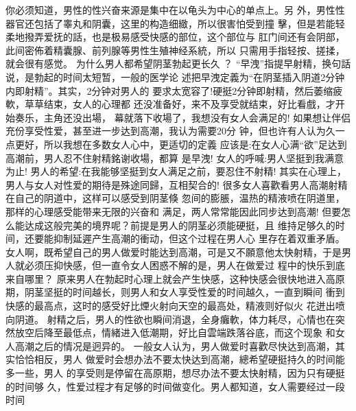 \documentclass[12pt,UTF8]{ctexbook}
\begin{document}
你必须知道，男性的性兴奋来源是集中在以龟头为中心的单点上。另
外，男性性器官还包括了睾丸和阴囊，这里的构造细緻，所以很害怕受到撞
擊，但是若能轻柔地撥弄爱抚的話，也是极易感受快感的部位，这个部位与
肛门间还有会阴部，此间密佈着精囊腺、前列腺等男性生殖神经系統，所以
只需用手指轻按、搓揉，就会很有感觉。
为什么男人都希望阴茎勃起更长久 ？
“早洩”指提早射精，换句話说，是勃起的时间太短暂，一般的医学论
述把早洩定義为“在阴茎插入阴道2分钟内即射精”。其实，2分钟对男人的
要求太宽容了!硬挺2分钟即射精，然后萎缩疲軟，草草结束，女人的心理都
还没准备好，来不及享受就结束，好比看戲，才开始奏乐，主角还没出場，
幕就落下收場了，我想没有女人会满足的!
如果想让伴侣充份享受性爱，甚至进一步达到高潮，我认为需要20分
钟，但也许有人认为久一点更好，所以我想在多数女人心中，更适切的定義
应该是:在女人心满“欲”足达到高潮前，男人忍不住射精銘谢收場，都算
是早洩!
女人的呼喊:男人坚挺到我满意为止!
男人的希望:在我能够坚挺到女人满足之前，要忍住不射精!
其实在心理上，男人与女人对性爱的期待是殊途同歸，互相契合的!
很多女人喜歡看男人高潮射精在自己的阴道中，这样可以感受到阴茎倏
忽间的膨脹，温热的精液喷在阴道里，那样的心理感受能带来无限的兴奋和
满足，两人常常能因此同步达到高潮!
但要怎么能达成这般完美的境界呢？前提是男人的阴茎必须能硬挺，且
维持足够久的时间，还要能抑制延遲产生高潮的衝动，但这个过程在男人心
里存在着双重矛盾。
女人啊，既希望自己的男人做爱时能达到高潮，可是又不願意他太快射精，于是男人就必须压抑快感，但一直令女人困惑不解的是，男人在做爱过
程中的快乐到底来自哪里？
原来男人在勃起时心理上就会产生快感，这种快感会很快地进入高原
期，阴茎坚挺的时间越长，则男人和女人享受性爱的时间越久，一直到瞬间
衝到快感的最高点，这时的感受好比煙火射向天空的最高处，精液则好似火
花迸出喷向阴道。
射精之后，男人的性欲也瞬间消退，全身癱軟，体力耗尽，心情也在突
然放空后降至最低点，情緒进入低潮期，好比自雲端跌落谷底，而这个现象
和女人高潮之后的情况是迥异的。
一般女人认为，男人做爱时喜歡尽快达到高潮，其实恰恰相反，男人
做爱时会想办法不要太快达到高潮，總希望硬挺持久的时间能多一些，男人
的享受则是停留在高原期，想尽办法不要太快射精，因为只有硬挺的时间够
久，性爱过程才有足够的时间做变化。男人都知道，女人需要经过一段时间
\end{document}
